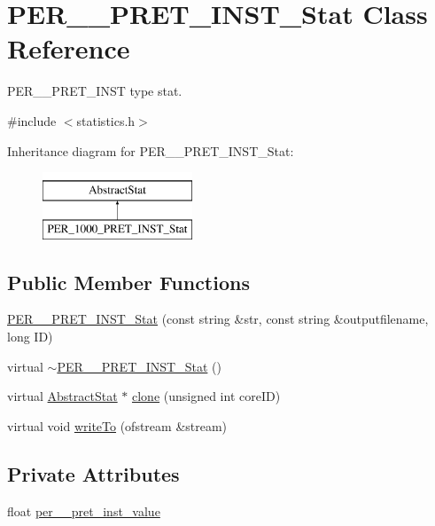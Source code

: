 \hypertarget{classPER__1000__PRET__INST__Stat}{
\section{PER\_\_\-PRET\_\-INST\_\-Stat Class Reference}
\label{classPER__1000__PRET__INST__Stat}
}


PER\_\_\-PRET\_\-INST type stat.  




{\ttfamily \#include $<$statistics.h$>$}

Inheritance diagram for PER\_\_\-PRET\_\-INST\_\-Stat:\begin{figure}[H]
\begin{center}
\leavevmode
\includegraphics[height=2.000000cm]{classPER__1000__PRET__INST__Stat}
\end{center}
\end{figure}
\subsection*{Public Member Functions}
\begin{DoxyCompactItemize}
\item 
\hyperlink{classPER__1000__PRET__INST__Stat_a936a4cc95050a97b7281b7a2fa07207f}{PER\_\_\-PRET\_\-INST\_\-Stat} (const string \&str, const string \&outputfilename, long ID)
\item 
virtual \hyperlink{classPER__1000__PRET__INST__Stat_a9726ed3943763009bcc37f8dab33411d}{$\sim$PER\_\_\-PRET\_\-INST\_\-Stat} ()
\item 
virtual \hyperlink{classAbstractStat}{AbstractStat} $\ast$ \hyperlink{classPER__1000__PRET__INST__Stat_a2aca938ef3f2acc92c46e3386680e5aa}{clone} (unsigned int coreID)
\item 
virtual void \hyperlink{classPER__1000__PRET__INST__Stat_aa353396e1c813cd55b6023de87abd807}{writeTo} (ofstream \&stream)
\end{DoxyCompactItemize}
\subsection*{Private Attributes}
\begin{DoxyCompactItemize}
\item 
float \hyperlink{classPER__1000__PRET__INST__Stat_a00fced31ff12b4b45b9d9e43aae01a60}{per\_\_\-pret\_\-inst\_\-value}
\end{DoxyCompactItemize}


